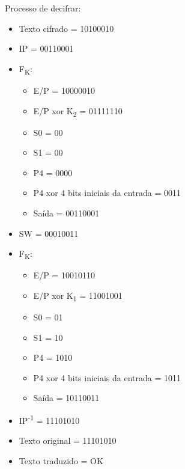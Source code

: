 \documentclass[12pt]{article}
\begin{document}
  Processo de decifrar:
  \begin{itemize}
    \item Texto cifrado = 10100010
    \item IP = 00110001
    \item F\textsubscript{K}:
    \begin{itemize}
      \item E/P = 10000010
      \item E/P xor K\textsubscript{2} = 01111110
      \item S0 = 00
      \item S1 = 00
      \item P4 = 0000
      \item P4 xor 4 bits iniciais da entrada = 0011
      \item Saída = 00110001
    \end{itemize}
    \item SW = 00010011
    \item F\textsubscript{K}:
    \begin{itemize}
      \item E/P = 10010110
      \item E/P xor K\textsubscript{1} = 11001001
      \item S0 = 01
      \item S1 = 10
      \item P4 = 1010
      \item P4 xor 4 bits iniciais da entrada = 1011
      \item Saída = 10110011
    \end{itemize}
    \item IP\textsuperscript{-1} = 11101010
    \item Texto original = 11101010
    \item Texto traduzido = OK
  \end{itemize}
\end{document}
